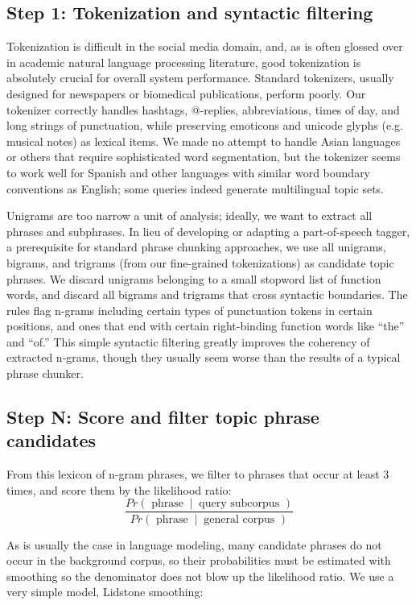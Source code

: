 \documentclass[letterpaper]{article}
\newcommand{\codenote}[1]{}
\begin{document}
\subsection{Step 1: Tokenization and syntactic filtering}

Tokenization is difficult in the social media domain, and, as is often glossed over in academic natural language processing literature, good tokenization is absolutely crucial for overall system performance.  Standard tokenizers, usually designed for newspapers or biomedical publications, perform poorly.  Our tokenizer correctly handles hashtags, @-replies, abbreviations, times of day, and long strings of punctuation, while preserving emoticons and unicode glyphs (e.g. musical notes) as lexical items.  We made no attempt to handle Asian languages or others that require sophisticated word segmentation, but the tokenizer seems to work well for Spanish and other languages with similar word boundary conventions as English; some queries indeed generate multilingual topic sets.

Unigrams are too narrow a unit of analysis; ideally, we want to extract all phrases and subphrases.  In lieu of developing or adapting a part-of-speech tagger, a prerequisite for standard phrase chunking approaches, we use all unigrams, bigrams, and trigrams (from our fine-grained tokenizations) as candidate topic phrases.  We discard unigrams belonging to a small stopword list of function words, and discard all bigrams and trigrams that cross syntactic boundaries. The rules flag n-grams including certain types of punctuation tokens in certain positions, and ones that end with certain right-binding function words like ``the'' and ``of.''  This simple syntactic filtering greatly improves the coherency of extracted n-grams, though they usually seem worse than the results of a typical phrase chunker.


\subsection{Step N: Score and filter topic phrase candidates}

\codenote{lang_model.py, ranking.py}
From this lexicon of n-gram phrases, we filter to phrases that occur at least 3 times, and score them by the likelihood ratio:
\[\frac{Pr(\textrm{ phrase } \ |\ \textrm{ query subcorpus })}
{Pr(\textrm{ phrase } \ |\ \textrm{ general corpus })}
\]

As is usually the case in language modeling, many candidate phrases do not occur in the background corpus, so their probabilities must be estimated with smoothing so the denominator does not blow up the likelihood ratio.  We use a very simple model, Lidstone smoothing:
\end{document}
